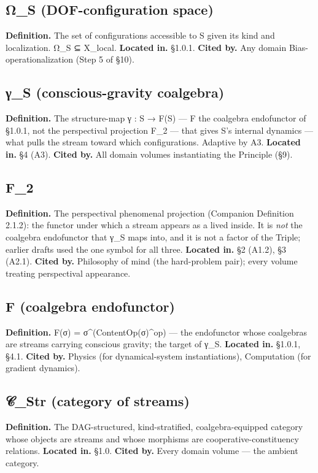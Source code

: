 \documentclass[11pt, openany]{book}
\begin{document}
\subsection{Ω\_\allowbreak{}S (DOF-configuration space)}
\textbf{Definition.} The set of configurations accessible to S given its kind and localization. Ω\_\allowbreak{}S ⊆ X\_\allowbreak{}local.
\textbf{Located in.} §1.0.1.
\textbf{Cited by.} Any domain Bias-operationalization (Step 5 of §10).

\subsection{γ\_\allowbreak{}S (conscious-gravity coalgebra)}
\textbf{Definition.} The structure-map γ : S → F(S) --- F the coalgebra endofunctor of §1.0.1, not the perspectival projection F\_\allowbreak{}2 --- that gives S's internal dynamics --- what pulls the stream toward which configurations. Adaptive by A3.
\textbf{Located in.} §4 (A3).
\textbf{Cited by.} All domain volumes instantiating the Principle (§9).

\subsection{F\_\allowbreak{}2}
\textbf{Definition.} The perspectival phenomenal projection (Companion Definition 2.1.2): the functor under which a stream appears as a lived inside. It is \textit{not} the coalgebra endofunctor that γ\_\allowbreak{}S maps into, and it is not a factor of the Triple; earlier drafts used the one symbol for all three.
\textbf{Located in.} §2 (A1.2), §3 (A2.1).
\textbf{Cited by.} Philosophy of mind (the hard-problem pair); every volume treating perspectival appearance.

\subsection{F (coalgebra endofunctor)}
\textbf{Definition.} F(σ) = σ\textasciicircum{}(ContentOp(σ)\textasciicircum{}op) --- the endofunctor whose coalgebras are streams carrying conscious gravity; the target of γ\_\allowbreak{}S.
\textbf{Located in.} §1.0.1, §4.1.
\textbf{Cited by.} Physics (for dynamical-system instantiations), Computation (for gradient dynamics).

\subsection{𝒞\_\allowbreak{}Str (category of streams)}
\textbf{Definition.} The DAG-structured, kind-stratified, coalgebra-equipped category whose objects are streams and whose morphisms are cooperative-constituency relations.
\textbf{Located in.} §1.0.
\textbf{Cited by.} Every domain volume --- the ambient category.
\end{document}
